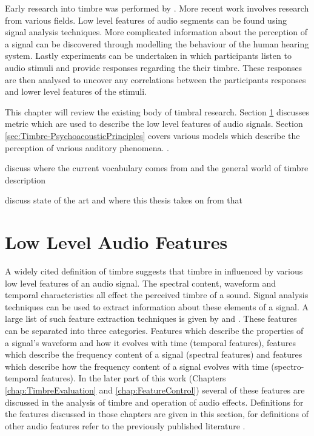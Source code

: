 	Early research into timbre was performed by \citet{helmholtz1875on}. More recent work involves research from various
	fields. Low level features of audio segments can be found using signal analysis techniques. More complicated
	information about the perception of a signal can be discovered through modelling the behaviour of the human hearing
	system. Lastly experiments can be undertaken in which participants listen to audio stimuli and provide responses
	regarding the their timbre. These responses are then analysed to uncover any correlations between the participants
	responses and lower level features of the stimuli.

	This chapter will review the existing body of timbral research. Section \ref{sec:Timbre-LowLevelFeatures} discusses
	metric which are used to describe the low level features of audio signals. Section
	\ref{sec:Timbre-PsychoacousticPrinciples} covers various models which describe the perception of various auditory
	phenomena. .

	\note
	{
		discuss where the current vocabulary comes from and the general world of timbre description

		discuss state of the art and where this thesis takes on from that
	}

\section{Low Level Audio Features}
\label{sec:Timbre-LowLevelFeatures}
	A widely cited definition of timbre \citep{ASA1960american} suggests that timbre in influenced by various low level
	features of an audio signal. The spectral content, waveform and temporal characteristics all effect the perceived
	timbre of a sound. Signal analysis techniques can be used to extract information about these elements of a signal.
	A large list of such feature extraction techniques is given by \citet{peeters2004a} and
	\citet{bullock2008implementing}. These features can be separated into three categories. Features which describe the
	properties of a signal's waveform and how it evolves with time (temporal features), features which describe the
	frequency content of a signal (spectral features) and features which describe how the frequency content of a signal
	evolves with time (spectro-temporal features). In the later part of this work (Chapters \ref{chap:TimbreEvaluation}
	and \ref{chap:FeatureControl}) several of these features are discussed in the analysis of timbre and operation of
	audio effects. Definitions for the features discussed in those chapters are given in this section, for definitions
	of other audio features refer to the previously published literature \citep{peeters2004a, bullock2008implementing}.

